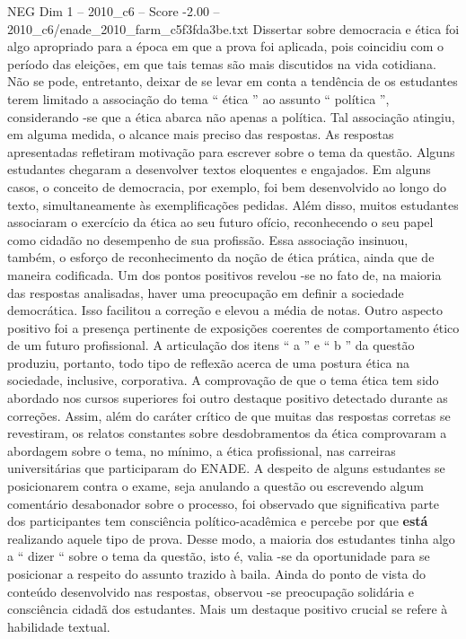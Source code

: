 \begin{textsample}{NEG Dim 1 – 2010\_c6 – Score -2.00 – 2010\_c6/enade\_2010\_farm\_c5f3fda3be.txt}
Dissertar sobre democracia e ética foi algo apropriado para a época em que a prova foi aplicada, pois coincidiu com o período das eleições, em que tais temas são mais discutidos na vida cotidiana.
Não se pode, entretanto, deixar de se levar em conta a tendência de os estudantes terem limitado a associação do tema “ ética ” ao assunto “ política ”, considerando -se que a ética abarca não apenas a política.
Tal associação atingiu, em alguma medida, o alcance mais preciso das respostas.
As respostas apresentadas refletiram motivação para escrever sobre o tema da questão.
Alguns estudantes chegaram a desenvolver textos eloquentes e engajados.
Em alguns casos, o conceito de democracia, por exemplo, foi bem desenvolvido ao longo do texto, simultaneamente às exemplificações pedidas.
Além disso, muitos estudantes associaram o exercício da ética ao seu futuro ofício, reconhecendo o seu papel como cidadão no desempenho de sua profissão.
Essa associação insinuou, também, o esforço de reconhecimento da noção de ética prática, ainda que de maneira codificada.
Um dos pontos positivos revelou -se no fato de, na maioria das respostas analisadas, haver uma preocupação em definir a sociedade democrática.
Isso facilitou a correção e elevou a média de notas.
Outro aspecto positivo foi a presença pertinente de exposições coerentes de comportamento ético de um futuro profissional.
A articulação dos itens “ a ” e “ b ” da questão produziu, portanto, todo tipo de reflexão acerca de uma postura ética na sociedade, inclusive, corporativa.
A comprovação de que o tema ética tem sido abordado nos cursos superiores foi outro destaque positivo detectado durante as correções.
Assim, além do caráter crítico de que muitas das respostas corretas se revestiram, os relatos constantes sobre desdobramentos da ética comprovaram a abordagem sobre o tema, no mínimo, a ética profissional, nas carreiras universitárias que participaram do ENADE.
A despeito de alguns estudantes se posicionarem contra o exame, seja anulando a questão ou escrevendo algum comentário desabonador sobre o processo, foi observado que significativa parte dos participantes tem consciência político-acadêmica e percebe por que \textbf{está} realizando aquele tipo de prova.
Desse modo, a maioria dos estudantes tinha algo a “ dizer “ sobre o tema da questão, isto é, valia -se da oportunidade para se posicionar a respeito do assunto trazido à baila.
Ainda do ponto de vista do conteúdo desenvolvido nas respostas, observou -se preocupação solidária e consciência cidadã dos estudantes.
Mais um destaque positivo crucial se refere à habilidade textual.

\end{textsample}
